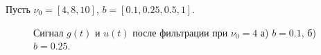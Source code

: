 \documentclass[a5paper, 10pt]{article}
\theoremstyle{definition}
\theoremstyle{plain}
\theoremstyle{remark}
\begin{document}
Пусть $\nu_0 = [4, 8, 10]$, $b = [0.1, 0.25, 0.5, 1]$.



\begin{figure}[h!]
\begin{minipage}[h]{0.5\linewidth}
\end{minipage}
\hfill
\begin{minipage}[h]{0.5\linewidth}
\end{minipage}
\caption{Сигнал $g(t)$ и $u(t)$ после фильтрации при $\nu_0 = 4$ а) $b=0.1$, б) $b=0.25$.}


\end{figure}
\end{document}
